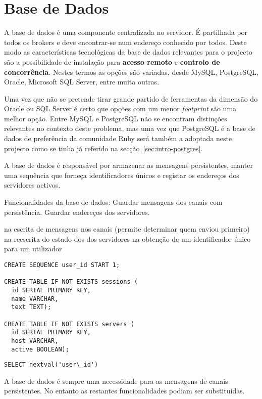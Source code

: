 \section{Base de Dados}
A base de dados é uma componente centralizada no servidor. É partilhada por todos os brokers e deve encontrar-se num endereço conhecido por todos. Deste modo as características tecnológicas da base de dados relevantes para o projecto são a possibilidade de instalação para \textbf{acesso remoto} e \textbf{controlo de concorrência}.
Nestes termos as opções são variadas, desde MySQL, PostgreSQL, Oracle, Microsoft SQL Server, entre muita outras.

Uma vez que não se pretende tirar grande partido de ferramentas da dimensão do Oracle ou SQL Server é certo que opções com um menor \textit{footprint} são uma melhor opção. Entre MySQL e PostgreSQL não se encontram distinções relevantes no contexto deste problema, mas uma vez que PostgreSQL é a base de dados de preferência da comunidade Ruby será também a adoptada neste projecto como se tinha já referido na secção~\ref{sec:intro-postgres}.

A base de dados é responsável por armazenar as mensagens persistentes, manter uma sequência que forneça identificadores únicos e registar os endereços dos servidores activos.

Funcionalidades da base de dados:
Guardar mensagens dos canais com persistência.
Guardar endereços dos servidores.

na escrita de mensagens nos canais (permite determinar quem enviou primeiro)
na reescrita do estado dos dos servidores
na obtenção de um identificador único para um utilizador

\renewcommand*{\lstlistingname}{SQL}
\begin{lstlisting}
CREATE SEQUENCE user_id START 1;

CREATE TABLE IF NOT EXISTS sessions (
  id SERIAL PRIMARY KEY,
  name VARCHAR,
  text TEXT);

CREATE TABLE IF NOT EXISTS servers (
  id SERIAL PRIMARY KEY,
  host VARCHAR,
  active BOOLEAN);
\end{lstlisting}

\begin{lstlisting}
SELECT nextval('user\_id')
\end{lstlisting}


A base de dados é sempre uma necessidade para as mensagens de canais persistentes.
No entanto as restantes funcionalidades podiam ser substituídas.

